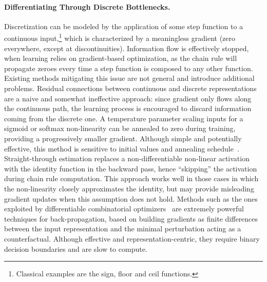 %
\paragraph{Differentiating Through Discrete Bottlenecks.}
Discretization can be modeled by the application of some step function to a continuous input,\footnote{Classical examples are the sign, floor and ceil functions.} which is characterized by a meaningless gradient (zero everywhere, except at discontinuities).
Information flow is effectively stopped, when learning relies on gradient-based optimization, as the chain rule will propagate zeroes every time a step function is composed to any other function.
%
%
Existing methods mitigating this issue are not general and introduce additional problems.
Residual connections between continuous and discrete representations are a naive and somewhat ineffective approach: since gradient only flows along the continuous path, the learning process is encouraged to discard information coming from the discrete one.
A temperature parameter scaling inputs for a sigmoid or softmax non-linearity can be annealed to zero during training, providing a progressively smaller gradient. Although simple and potentially effective, this method is sensitive to initial values and annealing schedule~\cite{kaiser2018discrete}.
Straight-through estimation replaces a non-differentiable non-linear activation with the identity function in the backward pass, hence ``skipping'' the activation during chain rule computation. This approach works well in those cases in which the non-linearity closely approximates the identity,
but may provide misleading gradient updates when this assumption does not hold.
Methods such as the ones exploited by differentiable combinatorial optimizers~\cite{fredrikson2023learning} are extremely powerful techniques for back-propagation, based on building gradients as finite differences between the input representation and the minimal perturbation acting as a counterfactual. Although effective and representation-centric, they require binary decision boundaries and are slow to compute. %

